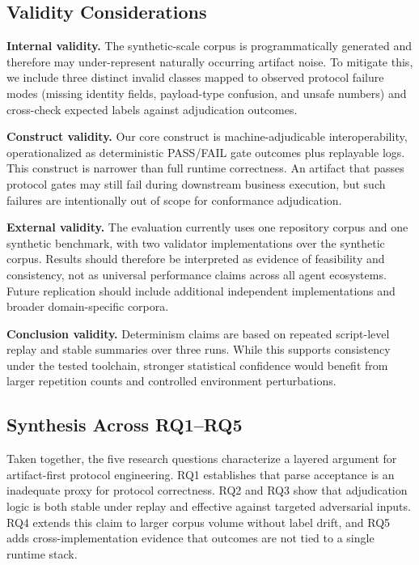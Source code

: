 \documentclass[10pt,conference]{IEEEtran}
\begin{document}
\subsection{Validity Considerations}

\textbf{Internal validity.} The synthetic-scale corpus is programmatically
generated and therefore may under-represent naturally occurring artifact noise.
To mitigate this, we include three distinct invalid classes mapped to observed
protocol failure modes (missing identity fields, payload-type confusion, and
unsafe numbers) and cross-check expected labels against adjudication outcomes.

\textbf{Construct validity.} Our core construct is machine-adjudicable
interoperability, operationalized as deterministic PASS/FAIL gate outcomes plus
replayable logs. This construct is narrower than full runtime correctness.
An artifact that passes protocol gates may still fail during downstream business
execution, but such failures are intentionally out of scope for conformance
adjudication.

\textbf{External validity.} The evaluation currently uses one repository corpus
and one synthetic benchmark, with two validator implementations over the
synthetic corpus. Results should therefore be interpreted as evidence of
feasibility and consistency, not as universal performance claims across all
agent ecosystems. Future replication should include additional independent
implementations and broader domain-specific corpora.

\textbf{Conclusion validity.} Determinism claims are based on repeated
script-level replay and stable summaries over three runs. While this supports
consistency under the tested toolchain, stronger statistical confidence would
benefit from larger repetition counts and controlled environment perturbations.

\subsection{Synthesis Across RQ1--RQ5}

Taken together, the five research questions characterize a layered argument for
artifact-first protocol engineering. RQ1 establishes that parse acceptance is an
inadequate proxy for protocol correctness. RQ2 and RQ3 show that adjudication
logic is both stable under replay and effective against targeted adversarial
inputs. RQ4 extends this claim to larger corpus volume without label drift, and
RQ5 adds cross-implementation evidence that outcomes are not tied to a single
runtime stack.
\end{document}
